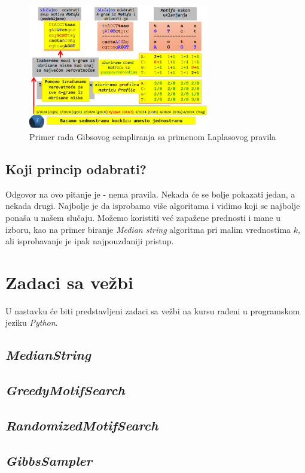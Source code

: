 \begin{figure}[h]
\caption{Primer rada Gibsovog sempliranja sa primenom Laplasovog pravila}
\centering
\includegraphics[width=0.7\textwidth]{poglavlja/2/slike/84.PNG}
\end{figure}

\subsection{Koji princip odabrati?}
Odgovor na ovo pitanje je - nema pravila. Nekada će se bolje pokazati jedan, a nekada drugi. Najbolje je da isprobamo više algoritama i vidimo koji se najbolje ponaša u našem slučaju. Možemo koristiti već zapažene prednosti i mane u izboru, kao na primer biranje \textit{Median string} algoritma pri malim vrednostima $k$, ali isprobavanje je ipak najpouzdaniji pristup.

\section{Zadaci sa vežbi}
U nastavku će biti predstavljeni zadaci sa vežbi na kursu rađeni u programskom jeziku \textit{Python}.

\subsection{\textit{MedianString}}



\subsection{\textit{GreedyMotifSearch}}



\subsection{\textit{RandomizedMotifSearch}}



\subsection{\textit{GibbsSampler}}



